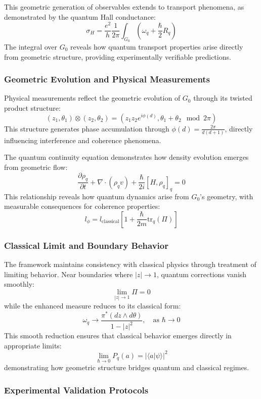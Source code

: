 \documentclass[10pt]{article}
\begin{document}
This geometric generation of observables extends to transport phenomena, as demonstrated by the quantum Hall conductance:
\[
\sigma_H = \frac{e^2}{h} \frac{1}{2\pi} \int_{G_0} \left( \omega_q + \frac{\hbar}{2} R_q \right)
\]
The integral over \(G_0\) reveals how quantum transport properties arise directly from geometric structure, providing experimentally verifiable predictions.

\subsubsection{Geometric Evolution and Physical Measurements}

Physical measurements reflect the geometric evolution of \(G_0\) through its twisted product structure:
\[
(z_1, \theta_1) \otimes (z_2, \theta_2) = \left( z_1 z_2 e^{i\phi(d)}, \theta_1 + \theta_2 \mod 2\pi \right)
\]
This structure generates phase accumulation through \(\phi(d) = \frac{2\pi}{d(d+1)}\), directly influencing interference and coherence phenomena.

The quantum continuity equation demonstrates how density evolution emerges from geometric flow:
\[
\frac{\partial \rho_q}{\partial t} + \nabla \cdot (\rho_q v) + \frac{\hbar}{2i} [H, \rho_q]_q = 0
\]
This relationship reveals how quantum dynamics arise from \(G_0\)'s geometry, with measurable consequences for coherence properties:
\[
l_\phi = l_\text{classical} \left[ 1 + \frac{\hbar}{2m} \text{tr}_q(\Pi) \right]
\]
\subsubsection{Classical Limit and Boundary Behavior}

The framework maintains consistency with classical physics through treatment of limiting behavior. Near boundaries where \(|z| \to 1\), quantum corrections vanish smoothly:
\[
\lim_{|z| \to 1} \Pi = 0
\]
while the enhanced measure reduces to its classical form:
\[
\omega_q \to \frac{\pi^*(dz \wedge d\theta)}{1 - |z|^2}, \quad \text{as } \hbar \to 0
\]
This smooth reduction ensures that classical behavior emerges directly in appropriate limits:
\[
\lim_{\hbar \to 0} P_q(a) = |\langle a | \psi \rangle|^2
\]
demonstrating how geometric structure bridges quantum and classical regimes.

\subsubsection{Experimental Validation Protocols}
\end{document}
